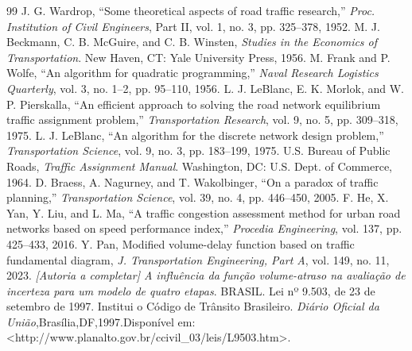 \documentclass[portuguese]{sbc2025}%
\begin{document}

\begin{thebibliography}{99}
 J. G. Wardrop, ``Some theoretical aspects of road traffic research,'' \textit{Proc. Institution of Civil Engineers}, Part II, vol. 1, no. 3, pp. 325--378, 1952.
 M. J. Beckmann, C. B. McGuire, and C. B. Winsten, \textit{Studies in the Economics of Transportation}. New Haven, CT: Yale University Press, 1956.
 M. Frank and P. Wolfe, ``An algorithm for quadratic programming,'' \textit{Naval Research Logistics Quarterly}, vol. 3, no. 1--2, pp. 95--110, 1956.
 L. J. LeBlanc, E. K. Morlok, and W. P. Pierskalla, ``An efficient approach to solving the road network equilibrium traffic assignment problem,'' \textit{Transportation Research}, vol. 9, no. 5, pp. 309--318, 1975.
 L. J. LeBlanc, ``An algorithm for the discrete network design problem,'' \textit{Transportation Science}, vol. 9, no. 3, pp. 183--199, 1975.
 U.S. Bureau of Public Roads, \textit{Traffic Assignment Manual}. Washington, DC: U.S. Dept. of Commerce, 1964.
 D. Braess, A. Nagurney, and T. Wakolbinger, ``On a paradox of traffic planning,'' \textit{Transportation Science}, vol. 39, no. 4, pp. 446--450, 2005.
 F. He, X. Yan, Y. Liu, and L. Ma, ``A traffic congestion assessment method for urban road networks based on speed performance index,'' \textit{Procedia Engineering}, vol. 137, pp. 425--433, 2016.
 {Y. Pan, Modified volume-delay function based on traffic fundamental diagram}, \textit{J. Transportation Engineering, Part A}, vol. 149, no. 11, 2023.
 \textit{[Autoria a completar] A influência da função volume-atraso na avaliação de incerteza para um modelo de quatro etapas}.
 BRASIL. Lei nº 9.503, de 23 de setembro de 1997. Institui o Código de Trânsito Brasileiro. \textit{Diário Oficial da União},Brasília,DF,1997.Disponível em: <http://www.planalto.gov.br/ccivil\_03/leis/L9503.htm>.
\end{thebibliography}
\end{document}
